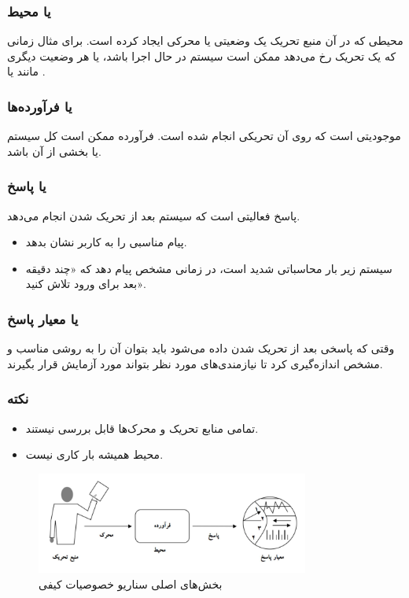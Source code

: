 \subsubsection{ یا محیط}

محیطی که در آن منبع تحریک یک وضعیتی یا محرکی ایجاد کرده است. برای مثال زمانی که
یک تحریک رخ می‌دهد ممکن است سیستم در حال اجرا باشد، یا هر وضعیت دیگری مانند
 یا .

\subsubsection{ یا فرآورده‌ها}

موجودیتی است که روی آن تحریکی انجام شده است. فرآورده ممکن است کل سیستم یا بخشی
از آن باشد.

\subsubsection{ یا پاسخ}

پاسخ فعالیتی است که سیستم بعد از تحریک شدن انجام می‌دهد.

\begin{itemize}
    \item پیام مناسبی را به کاربر نشان بدهد.
    \item سیستم زیر بار محاسباتی شدید است، در زمانی مشخص پیام دهد که «چند دقیقه
    بعد برای ورود تلاش کنید».
\end{itemize}

\subsubsection{ یا معیار پاسخ}

وقتی که پاسخی بعد از تحریک شدن داده می‌شود باید بتوان آن را به روشی مناسب و مشخص
اندازه‌گیری کرد تا نیازمندی‌های مورد نظر بتواند مورد آزمایش قرار بگیرند.

\subsubsection*{نکته}

\begin{itemize}
    \item تمامی منابع تحریک و محرک‌ها قابل بررسی نیستند.
    \item محیط همیشه بار کاری نیست.
\end{itemize}

\begin{figure}[H]
    \centering
    \includegraphics[width=0.8\textwidth]{images/main_section_of_general_scenario.png}
    \caption{بخش‌های اصلی سناریو خصوصیات کیفی}
    \label{fig:generalScenarioMainSections}
\end{figure}

